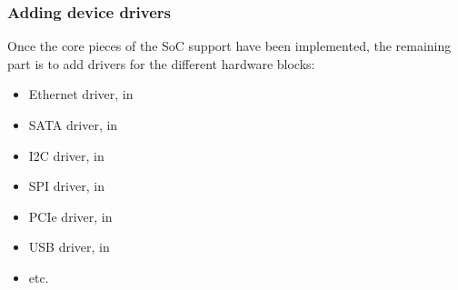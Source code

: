 \begin{frame}
  \frametitle{Adding device drivers}
  Once the core pieces of the SoC support have been implemented, the
  remaining part is to add drivers for the different hardware blocks:
  \begin{itemize}
  \item Ethernet driver, in 
  \item SATA driver, in 
  \item I2C driver, in 
  \item SPI driver, in 
  \item PCIe driver, in 
  \item USB driver, in 
  \item etc.
  \end{itemize}
\end{frame}
